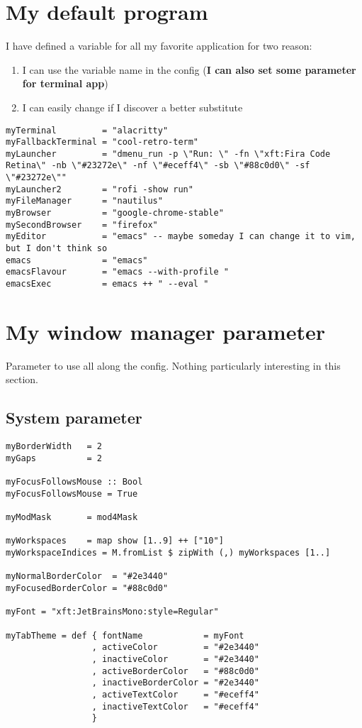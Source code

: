 \documentclass[11pt]{article}
\begin{document}
\section{My default program}
\label{sec:orgc3cf90a}
I have defined a variable for all my favorite application for two reason:
\begin{enumerate}
\item I can use the variable name in the config (\textbf{I can also set some parameter for terminal app})
\item I can easily change if I discover a better substitute
\end{enumerate}
\begin{verbatim}
myTerminal         = "alacritty"
myFallbackTerminal = "cool-retro-term"
myLauncher         = "dmenu_run -p \"Run: \" -fn \"xft:Fira Code Retina\" -nb \"#23272e\" -nf \"#eceff4\" -sb \"#88c0d0\" -sf \"#23272e\"" 
myLauncher2        = "rofi -show run"
myFileManager      = "nautilus"
myBrowser          = "google-chrome-stable"
mySecondBrowser    = "firefox"
myEditor           = "emacs" -- maybe someday I can change it to vim, but I don't think so
emacs              = "emacs"
emacsFlavour       = "emacs --with-profile "
emacsExec          = emacs ++ " --eval "
\end{verbatim}
\section{My window manager parameter}
\label{sec:org49831e6}
Parameter to use all along the config.
Nothing particularly interesting in this section.
\subsection{System parameter}
\label{sec:org2d92336}
\begin{verbatim}
myBorderWidth   = 2
myGaps          = 2

myFocusFollowsMouse :: Bool
myFocusFollowsMouse = True

myModMask       = mod4Mask

myWorkspaces    = map show [1..9] ++ ["10"]
myWorkspaceIndices = M.fromList $ zipWith (,) myWorkspaces [1..]

myNormalBorderColor  = "#2e3440"
myFocusedBorderColor = "#88c0d0"

myFont = "xft:JetBrainsMono:style=Regular"

myTabTheme = def { fontName            = myFont
                 , activeColor         = "#2e3440"
                 , inactiveColor       = "#2e3440"
                 , activeBorderColor   = "#88c0d0"
                 , inactiveBorderColor = "#2e3440"
                 , activeTextColor     = "#eceff4"
                 , inactiveTextColor   = "#eceff4"
                 }
\end{verbatim}
\end{document}
